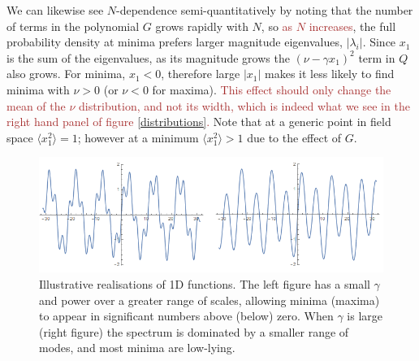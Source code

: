 \documentclass[12pt]{article}
\newcommand{\sh}[1]{\textcolor{brown}{#1}}
\begin{document}

We can likewise see $N$-dependence semi-quantitatively by noting that the number of terms in the polynomial $G$ grows rapidly with $N$, so \sh{as $N$ increases}, the full probability density at minima prefers larger magnitude eigenvalues, $|\lambda_i|$. Since $x_1$ is the sum of the eigenvalues, as its magnitude grows the $(\nu-\gamma x_1)^2$ term in $Q$ also grows. For minima, $x_1<0$, therefore large $|x_1|$ makes it less likely to find minima with $\nu >0$ (or $\nu <0 $ for maxima). \sh{This effect should only change the mean of the $\nu$ distribution, and not its width, which is indeed what we see in the right hand panel of figure \ref{distributions}.}  Note that at a generic point in field space $\langle x_1^2\rangle = 1$; however at a minimum $\langle x_1^2 \rangle >1$ due to the effect of $G$.   


\begin{figure}
  \centering
    \includegraphics[width=\linewidth]{TwoSigmas.png}
  \caption{Illustrative realisations of 1D functions. The left figure has a small $\gamma$ and power over a greater range of scales, allowing minima (maxima) to appear in significant numbers above (below) zero. When $\gamma$ is large (right figure) the spectrum is dominated by a smaller range of modes, and most minima are low-lying.}
  \label{examples1}
\end{figure}
\end{document}
